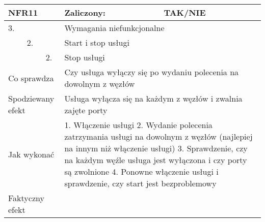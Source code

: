 \begin{tabular}{|p{20pt}|p{20pt}|p{20pt}|p{250pt}|p{60pt}|}
	\hline
	\multicolumn{3}{|p{70pt}|}{NFR11} & Zaliczony: & TAK/NIE \\ \hline
	3. & & & \multicolumn{2}{|p{310pt}|}{Wymagania niefunkcjonalne } \\ \hline
	& 2. & & \multicolumn{2}{|p{310pt}|}{Start i stop usługi } \\ \hline
	& & 2. & \multicolumn{2}{|p{310pt}|}{Stop usługi } \\ \hline
	\multicolumn{3}{|p{70pt}|}{Co sprawdza} & \multicolumn{2}{|p{310pt}|}{Czy usługa wyłączy się po wydaniu polecenia na dowolnym z węzłów} \\ \hline
	\multicolumn{3}{|p{70pt}|}{Spodziewany efekt} & \multicolumn{2}{|p{310pt}|}{Usługa wyłącza się na każdym z węzłów i zwalnia zajęte porty} \\ \hline
	\multicolumn{3}{|p{70pt}|}{Jak wykonać} & \multicolumn{2}{|p{310pt}|}{1. Włączenie usługi
2. Wydanie polecenia zatrzymania usługi na dowolnym z węzłów (najlepiej na innym niż włączenie usługi)
3. Sprawdzenie, czy na każdym węźle usługa jest wyłączona i czy porty są zwolnione
4. Ponowne włączenie usługi i sprawdzenie, czy start jest bezproblemowy} \\ \hline
	\multicolumn{3}{|p{70pt}|}{Faktyczny efekt} & \multicolumn{2}{|p{310pt}|}{} \\ \hline
\end{tabular}

